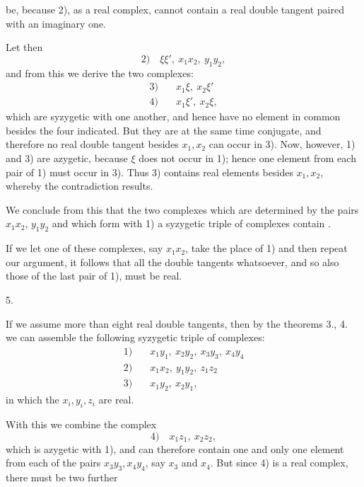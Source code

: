 be, because 2), as a real complex, cannot contain a real double tangent
paired with an imaginary one.

Let then
\[
2)\quad \xi\xi',\ x_1x_2,\ y_1y_2,
\]
and from this we derive the two complexes:
\[
\begin{aligned}
3)&\quad x_1\xi,\ x_2\xi'\\
4)&\quad x_1\xi',\ x_2\xi,
\end{aligned}
\]
which are syzygetic with one another, and hence have no element in
common besides the four indicated. But they are at the same time
conjugate, and therefore no real double tangent besides $x_1, x_2$ can
occur in 3). Now, however, 1) and 3) are azygetic, because
$\xi$ does not occur in 1); hence one element from each pair of 1)
must occur in 3). Thus 3) contains real elements besides $x_1, x_2$,
whereby the contradiction results.

We conclude from this that the two complexes which are determined
by the pairs $x_1x_2$, $y_1y_2$ and which form with 1) a syzygetic
triple of complexes contain .

If we let one of these complexes, say $x_1x_2$, take the place
of 1) and then repeat our argument, it follows
that all the double tangents whatsoever, and so also those of the
last pair of 1), must be real.

5. 

If we assume more than eight real double tangents, then by
the theorems 3., 4. we can assemble the following syzygetic triple
of complexes:
\[
\begin{aligned}
1)&\quad x_1y_1,\ x_2y_2,\ x_3y_3,\ x_4y_4\\
2)&\quad x_1x_2,\ y_1y_2,\ z_1z_2\\
3)&\quad x_1y_2,\ x_2y_1,
\end{aligned}
\]
in which the $x_i, y_i, z_i$ are real.

With this we combine the complex
\[
4)\quad x_1z_1,\ x_2z_2,
\]
which is azygetic with 1), and can therefore contain one and only
one element from each of the pairs $x_3y_3, x_4y_4$, say $x_3$ and $x_4$.
But since 4) is a real complex, there must be two further
